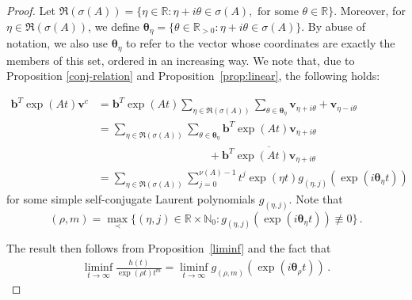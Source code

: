 \begin{proof}
  Let
  $\Re(\sigma(A))=\lbrace \eta\in\mathbb{R}:
  \eta+i\theta\in\sigma(A),\mbox{ for some }\theta\in\mathbb{R}
  \rbrace$. Moreover, for $\eta\in\Re(\sigma(A))$, we define
  $\boldsymbol{\theta}_{\eta}=\lbrace \theta\in\mathbb{R}_{>0}:
  \eta+i\theta \in\sigma(A) \rbrace$. By abuse of notation, we also
  use $\boldsymbol{\theta}_{\eta}$ to refer to the vector whose
  coordinates are exactly the members of this set, ordered in an
  increasing way. We note that, due to Proposition \ref{conj-relation}
  and Proposition~\ref{prop:linear}, the
  following holds:

\begin{align*}
\boldsymbol{b}^{T}\exp(At)\boldsymbol{v}^{c} &= \boldsymbol{b}^{T} \exp(At) \sum\limits_{\eta\in\Re(\sigma(A))} \sum\limits_{\theta\in\boldsymbol{\theta}_{\eta}} \boldsymbol{v}_{\eta+i\theta}+\boldsymbol{v}_{\eta-i\theta} \\
&= \sum\limits_{\eta\in\Re(\sigma(A))} \sum\limits_{\theta\in\boldsymbol{\theta}_{\eta}} \boldsymbol{b}^{T} \exp(At) \boldsymbol{v}_{\eta+i\theta} \\
& \qquad \qquad \qquad \qquad \qquad + \overline{\boldsymbol{b}^{T} \exp(At) \boldsymbol{v}_{\eta+i\theta}} \\
& = \sum\limits_{\eta\in\Re(\sigma(A))} \sum\limits_{j=0}^{\nu(A)-1} t^{j}\exp(\eta t)  g_{(\eta,j)}( \exp(i\boldsymbol{\theta}_{\eta}t) )
\end{align*}
for some simple self-conjugate Laurent polynomials
$g_{(\eta,j)}$.
Note that
\begin{equation*}
(\rho,m)=\max\limits_{\prec} \lbrace (\eta,j)\in\mathbb{R}\times
\mathbb{N}_{0}: g_{(\eta,j)}(\exp(i\boldsymbol{\theta}_{\eta} t)) \not
\equiv 0 \rbrace \, .
\end{equation*}

The result then follows from Proposition~\ref{liminf} and the fact
that
\begin{align*}
\liminf\limits_{t\rightarrow\infty} \frac{h(t)}{\exp(\rho t)t^{m}}=
  \liminf\limits_{t\rightarrow\infty}
  g_{(\rho,m)}(\exp(i\boldsymbol{\theta}_{\rho} t)) \, .
\end{align*}
\end{proof}

